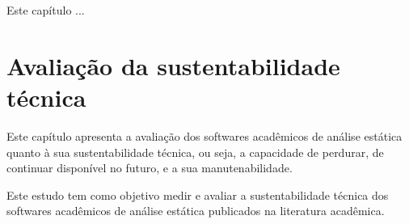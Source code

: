 {Este capítulo ...}

\section{Avaliação da sustentabilidade técnica}

Este capítulo apresenta a avaliação dos softwares acadêmicos de análise
estática quanto à sua sustentabilidade técnica, ou seja, a
capacidade de perdurar, de continuar disponível no futuro, e a sua
manutenabilidade.

\label{sustentabilidade-tecnica}


%

Este estudo tem como objetivo medir e avaliar a sustentabilidade técnica dos
softwares acadêmicos de análise estática publicados na literatura acadêmica.


